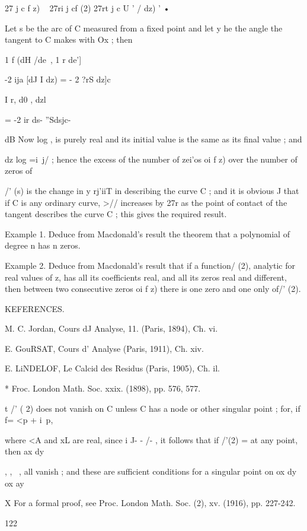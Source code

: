 27   j c f z) ~ 27ri j cf (2) 27rt j c U ' / dz) ' • 

Let s be the arc of C measured from a fixed point and let y  he the angle the tangent to 
C makes with Ox ; then 

1 f (dH /de\ , 1 r de'] 

-2 ija [dJ  I dz)  = - 2 ?rS dz]c 

I r, d0 , dzl 

= -2 ir ds- ''Sdsjc- 

dB 
Now log , is purely real and its initial value is the same as its final value ; and 

dz 
log =i\ j/ ; hence the excess of the number of zei'os oi f z) over the number of zeros of 

/' (s) is the change in y rj'iiT in describing the curve C ; and it is obvious J that if C is any 
ordinary curve, >//  increases by 27r as the point of contact of the tangent describes the 
curve C ; this gives the required result. 

Example 1. Deduce from Macdonald's result the theorem that a polynomial of degree 
n has n zeros. 

Example 2. Deduce from Macdonald's result that if a function/ (2), analytic for real 
values of z, has all its coefficients real, and all its zeros real and different, then between 
two consecutive zeros oi f z) there is one zero and one only of/' (2). 



KEFERENCES. 

M. C. Jordan, Cours dJ Analyse, 11. (Paris, 1894), Ch. vi. 

E. GouRSAT, Cours d' Analyse (Paris, 1911), Ch. xiv. 

E. LiNDELOF, Le Calcid des Residus (Paris, 1905), Ch. il. 

* Froc. London Math. Soc. xxix. (1898), pp. 576, 577. 

t /' ( 2) does not vanish on C unless C has a node or other singular point ; for, if f= <p + i\ p, 

where <A and xL are real, since i J- - /- , it follows that if /'(2) = at any point, then 
  ax dy 

  ,   , ~,   all vanish ; and these are sufficient conditions for a singular point on 
ox dy ox ay 

X For a formal proof, see Proc. London Math. Soc. (2), xv. (1916), pp. 227-242. 



122 



